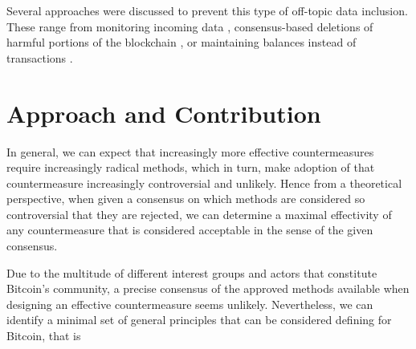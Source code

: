 \documentclass[a4paper,11pt,titlepage]{scrbook}
\begin{document}
Several approaches were discussed to prevent this type of off-topic data inclusion.
These range from monitoring incoming data \cite[chap.~IV.A]{matzutt_thwarting_2018}, consensus-based deletions of harmful portions of the blockchain \cites{ateniese_redactable_2017}{puddu_chain:_2017}, 
or maintaining balances instead of transactions \cite{bruce_miniblockchain_2017}.





\section{Approach and Contribution}

In general, we can expect that increasingly more effective countermeasures require increasingly radical methods, which in turn, make adoption of that countermeasure increasingly controversial and unlikely.
Hence from a theoretical perspective, when given a consensus on which methods are considered so controversial that they are rejected, we can determine a maximal effectivity of any countermeasure that is considered acceptable in the sense of the given consensus.

Due to the multitude of different interest groups and actors that constitute Bitcoin's community, a precise consensus of the approved methods available when designing an effective countermeasure seems unlikely.
Nevertheless, we can identify a minimal set of general principles that can be considered defining for Bitcoin,
that is 
\end{document}
